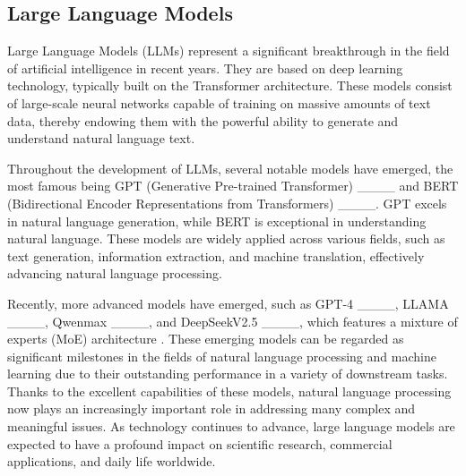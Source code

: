 \subsection{Large Language Models}
Large Language Models (LLMs) represent a significant breakthrough in the field of artificial intelligence in recent years. They are based on deep learning technology, typically built on the Transformer architecture. These models consist of large-scale neural networks capable of training on massive amounts of text data, thereby endowing them with the powerful ability to generate and understand natural language text.

Throughout the development of LLMs, several notable models have emerged, the most famous being GPT (Generative Pre-trained Transformer) ____ and BERT (Bidirectional Encoder Representations from Transformers) ____. GPT excels in natural language generation, while BERT is exceptional in understanding natural language. These models are widely applied across various fields, such as text generation, information extraction, and machine translation, effectively advancing natural language processing.

Recently, more advanced models have emerged, such as GPT-4 ____, LLAMA ____, Qwenmax ____, and DeepSeekV2.5 ____, which features a mixture of experts (MoE) architecture . These emerging models can be regarded as significant milestones in the fields of natural language processing and machine learning due to their outstanding performance in a variety of downstream tasks. Thanks to the excellent capabilities of these models, natural language processing now plays an increasingly important role in addressing many complex and meaningful issues. As technology continues to advance, large language models are expected to have a profound impact on scientific research, commercial applications, and daily life worldwide.

